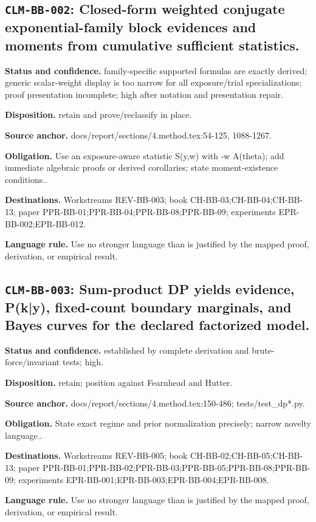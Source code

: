 \subsection[\texttt{CLM-BB-002}]{\texttt{CLM-BB-002}: Closed-form weighted conjugate exponential-family block evidences and moments from cumulative sufficient statistics.}
\textbf{Status and confidence.} family-specific supported formulas are exactly derived; generic scalar-weight display is too narrow for all exposure/trial specializations; proof presentation incomplete; high after notation and presentation repair.\par
\textbf{Disposition.} retain and prove/reclassify in place.\par
\textbf{Source anchor.} docs/report/sections/4.method.tex:54-125, 1088-1267.\par
\textbf{Obligation.} Use an exposure-aware statistic S(y,w) with -w A(theta); add immediate algebraic proofs or derived corollaries; state moment-existence conditions..\par
\textbf{Destinations.} Workstreams REV-BB-003; book CH-BB-03;CH-BB-04;CH-BB-13; paper PPR-BB-01;PPR-BB-04;PPR-BB-08;PPR-BB-09; experiments EPR-BB-002;EPR-BB-012.\par
\textbf{Language rule.} Use no stronger language than is justified by the mapped proof, derivation, or empirical result.

\subsection[\texttt{CLM-BB-003}]{\texttt{CLM-BB-003}: Sum-product DP yields evidence, P(k|y), fixed-count boundary marginals, and Bayes curves for the declared factorized model.}
\textbf{Status and confidence.} established by complete derivation and brute-force/invariant tests; high.\par
\textbf{Disposition.} retain; position against Fearnhead and Hutter.\par
\textbf{Source anchor.} docs/report/sections/4.method.tex:150-486; tests/test\_dp*.py.\par
\textbf{Obligation.} State exact regime and prior normalization precisely; narrow novelty language..\par
\textbf{Destinations.} Workstreams REV-BB-005; book CH-BB-02;CH-BB-05;CH-BB-13; paper PPR-BB-01;PPR-BB-02;PPR-BB-03;PPR-BB-05;PPR-BB-08;PPR-BB-09; experiments EPR-BB-001;EPR-BB-003;EPR-BB-004;EPR-BB-008.\par
\textbf{Language rule.} Use no stronger language than is justified by the mapped proof, derivation, or empirical result.

